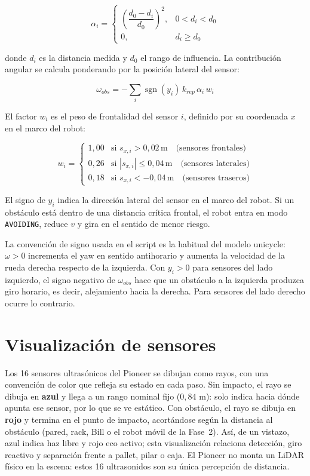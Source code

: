 \[
\alpha_i =
\begin{cases}
\left(\dfrac{d_0-d_i}{d_0}\right)^2, & 0 < d_i < d_0\\
0, & d_i \ge d_0
\end{cases}
\]

donde \(d_i\) es la distancia medida y \(d_0\) el rango de influencia. La
contribución angular se calcula ponderando por la posición lateral del sensor:

\[
\omega_{obs} = -\sum_i \operatorname{sgn}(y_i)\,k_{rep}\,\alpha_i\,w_i
\]

El factor \(w_i\) es el peso de frontalidad del sensor \(i\), definido por su
coordenada \(x\) en el marco del robot:

\[
w_i =
\begin{cases}
1{,}00 & \text{si } s_{x,i} > 0{,}02\,\text{m} \quad\text{(sensores frontales)}\\
0{,}26 & \text{si } |s_{x,i}| \le 0{,}04\,\text{m} \quad\text{(sensores laterales)}\\
0{,}18 & \text{si } s_{x,i} < -0{,}04\,\text{m} \quad\text{(sensores traseros)}
\end{cases}
\]

El signo de \(y_i\) indica la dirección lateral del sensor en el marco
del robot. Si un obstáculo está dentro de una distancia crítica frontal, el robot
entra en modo \texttt{AVOIDING}, reduce \(v\) y gira en el sentido de menor
riesgo.

La convención de signo usada en el script es la habitual del modelo unicycle:
\(\omega>0\) incrementa el yaw en sentido antihorario y aumenta la velocidad de
la rueda derecha respecto de la izquierda. Con \(y_i>0\) para sensores del lado
izquierdo, el signo negativo de \(\omega_{obs}\) hace que un obstáculo a la
izquierda produzca giro horario, es decir, alejamiento hacia la derecha. Para
sensores del lado derecho ocurre lo contrario.

\section{Visualización de sensores}

Los 16 sensores ultrasónicos del Pioneer se dibujan como rayos, con una
convención de color que refleja su estado en cada paso. Sin impacto, el rayo se
dibuja en \textbf{azul} y llega a un rango nominal fijo (\(0{,}84\) m): solo
indica hacia dónde apunta ese sensor, por lo que se ve estático. Con obstáculo, el
rayo se dibuja en \textbf{rojo} y termina en el punto de impacto, acortándose
según la distancia al obstáculo (pared, rack, Bill o el robot móvil de la Fase~2).
Así, de un vistazo, azul indica haz libre y rojo eco activo; esta visualización
relaciona detección, giro reactivo y separación frente a pallet, pilar o caja. El
Pioneer no monta un LiDAR físico en la escena: estos 16 ultrasonidos son su única
percepción de distancia.

